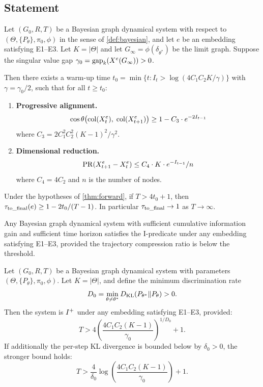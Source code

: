 \documentclass{../shared/primo}
\begin{document}
\subsection{Statement}

\begin{theorem}\label{thm:forward}
Let $(G_0, R, T)$ be a Bayesian graph dynamical system with respect to $(\Theta, \{P_\theta\}, \pi_0, \phi)$ in the sense of \cref{def:bayesian}, and let $e$ be an embedding satisfying E1--E3. Let $K = |\Theta|$ and let $G_\infty = \phi(\delta_{\theta^*})$ be the limit graph. Suppose the singular value gap $\gamma_0 = \mathrm{gap}_k(X^e(G_\infty)) > 0$.

Then there exists a warm-up time $t_0 = \min\{t : I_t > \log(4C_1 C_2 K / \gamma)\}$ with $\gamma = \gamma_0/2$, such that for all $t \geq t_0$:

\begin{enumerate}
\item[\textup{(i)}] \textbf{Progressive alignment.}
\[
\cos\theta\bigl(\operatorname{col}(X_t^e),\; \operatorname{col}(X_{t+1}^e)\bigr) \geq 1 - C_3 \cdot e^{-2I_{t-1}}
\]
where $C_3 = 2C_1^2 C_2^2 (K{-}1)^2 / \gamma^2$.

\item[\textup{(ii)}] \textbf{Dimensional reduction.}
\[
\operatorname{PR}(X_{t+1}^e - X_t^e) \leq C_4 \cdot K \cdot e^{-I_{t-1}} / n
\]
where $C_4 = 4C_2$ and $n$ is the number of nodes.
\end{enumerate}
\end{theorem}

\begin{corollary}\label{cor:tau}
Under the hypotheses of \cref{thm:forward}, if $T > 4t_0 + 1$, then $\tau_{\mathrm{to\_final}}(e) \geq 1 - 2t_0 / (T - 1)$. In particular $\tau_{\mathrm{to\_final}} \to 1$ as $T \to \infty$.
\end{corollary}

\begin{corollary}[I-positivity]\label{cor:ipos}
Any Bayesian graph dynamical system with sufficient cumulative information gain and sufficient time horizon satisfies the I-predicate under any embedding satisfying E1--E3, provided the trajectory compression ratio is below the threshold.
\end{corollary}

\begin{corollary}\label{cor:explicit}
Let $(G_0, R, T)$ be a Bayesian graph dynamical system with parameters $(\Theta, \{P_\theta\}, \pi_0, \phi)$. Let $K = |\Theta|$, and define the minimum discrimination rate
\[
D_0 = \min_{\theta \neq \theta^*} D_{\mathrm{KL}}(P_{\theta^*} \| P_\theta) > 0.
\]
Then the system is $I\textsuperscript{+}$ under any embedding satisfying E1--E3, provided:
\[
T > 4 \left(\frac{4C_1 C_2 (K{-}1)}{\gamma_0}\right)^{1/D_0} + 1.
\]
If additionally the per-step KL divergence is bounded below by $\delta_0 > 0$, the stronger bound holds:
\[
T > \frac{4}{\delta_0} \log\!\left(\frac{4C_1 C_2 (K{-}1)}{\gamma_0}\right) + 1.
\]
\end{corollary}
\end{document}
